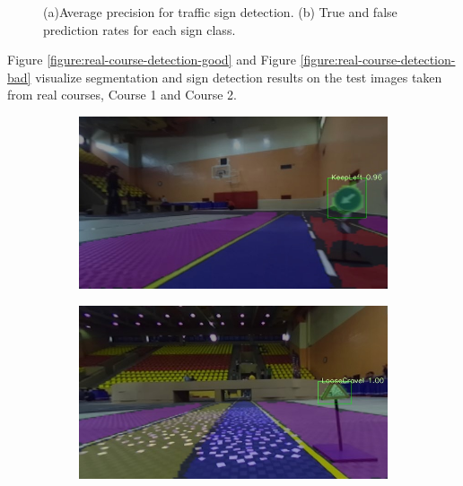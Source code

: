 \begin{figure}[h]
\begin{subfigure}[b]{0.45\linewidth}
    \caption{}
  \end{subfigure}
  \caption[Evaluation of traffic sign detection and recognition]{(a)Average
    precision for traffic sign detection. (b) True and false prediction rates
    for each sign class.}
  \label{figure:average-precision}
\end{figure}


Figure \ref{figure:real-course-detection-good} and Figure
\ref{figure:real-course-detection-bad} visualize segmentation and sign
detection results on the test images taken from real courses, Course 1 and
Course 2.

\begin{figure}[h]
  \centering
  \begin{subfigure}[b]{0.45\linewidth}
    \includegraphics[width=\linewidth]{figures/experiments/real/keepleft.jpg}
  \end{subfigure}
  \begin{subfigure}[b]{0.45\linewidth}
    \includegraphics[width=\linewidth]{figures/experiments/real/loosegravel.jpg}
  \end{subfigure}
  \begin{subfigure}[b]{0.45\linewidth}

\end{subfigure}
\end{figure}
